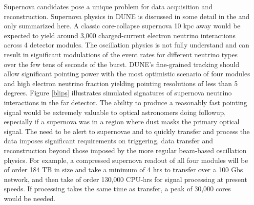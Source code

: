 Supernova candidates pose a unique problem for data acquisition and reconstruction.  Supernova physics in DUNE is discussed in some detail in the \cite{ Abi:2020evt} and only summarized here. A classic core-collapse supernova 10 kpc away would be expected to yield around 3,000  charged-current electron neutrino interactions across 4 detector modules.  The oscillation physics is not fully understand and can result in significant modulations of the event rates for different neutrino types  over the few tens of seconds of the burst.  DUNE's fine-grained tracking should allow significant pointing power with the most optimistic scenario of four modules and high electron neutrino fraction yielding pointing resolutions of less than 5 degrees.   Figure \ref{blips} illustrates simulated signatures of supernova neutrino interactions in the far detector. The ability to produce a reasonably fast pointing signal would be extremely valuable to optical astronomers doing followup, especially if a supernova was in a region where dust masks the primary optical signal.   The need to be alert to supernovae and to quickly transfer and process the data imposes significant requirements on triggering, data transfer and reconstruction beyond those imposed by the more regular beam-based oscillation physics.   For example, a compressed supernova readout of all four modules will be of order 184 TB in size and take a minimum of 4 hrs to transfer over a 100 Gbs network,  and then take of order 130,000 CPU-hrs for signal processing at present speeds.  If processing takes the same time as transfer, a peak of 30,000 cores would be needed. 


